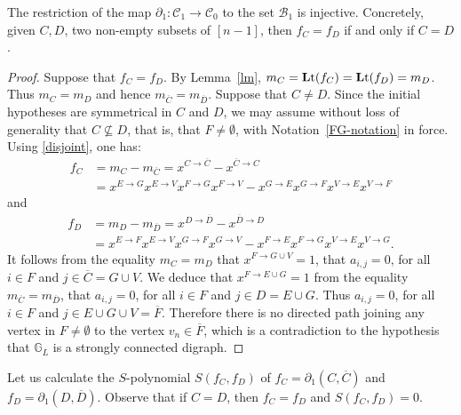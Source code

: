 \documentclass[ALCO]{cedram}
\newcommand{\mbg}{\mbox{$\mathbb{G}$}}
\newcommand{\lt}{\mbox{${\bf L}{\rm t}$}}
\newcommand{\mcb}{\mbox{$\mathcal{B}$}}
\newcommand{\mcc}{\mbox{$\mathcal{C}$}}
\newcommand{\dif}{\mbox{$\partial$}}
\begin{document}
\begin{lemma}\label{fc=fd}
The restriction of the map $\dif_1:\mcc_1\to\mcc_0$ to the set
$\mcb_1$ is injective. Concretely, given $C,D$, two non-empty subsets
of $[n-1]$, then $f_C=f_D$ if and only if $C=D$.
\end{lemma}
\begin{proof}
Suppose that $f_C=f_D$. By Lemma~\ref{lm},
$m_C=\lt(f_C)=\lt(f_D)=m_D$. Thus $m_C=m_D$ and hence
$m_{\overline{C}}=m_{\overline{D}}$. Suppose that $C\neq D$. Since the
initial hypotheses are symmetrical in $C$ and $D$, we may assume
without loss of generality that $C\not\subseteq D$, that is, that
$F\neq\emptyset$, with Notation~\ref{FG-notation} in force. Using
\eqref{disjoint}, one has:
\begin{align*}
f_C & = m_{C}-m_{\overline{C}}=x^{C\to \overline{C}}-x^{\overline{C}\to C}\\&=
  x^{E\to G}x^{E\to V}x^{F\to G}x^{F\to V}-x^{G\to E}x^{G\to F}x^{V\to
    E}x^{V\to F}
\end{align*}
and 
\begin{align*}
f_D & =  m_{D}-m_{\overline{D}}=x^{D\to \overline{D}}-x^{\overline{D}\to
    D}\\ &= x^{E\to F}x^{E\to V}x^{G\to F}x^{G\to V}-x^{F\to
    E}x^{F\to G}x^{V\to E}x^{V\to G}.
\end{align*}
It follows from the equality $m_C=m_D$ that $x^{F\to G\cup V}=1$,
\ie that $a_{i,j}=0$, for all $i\in F$ and $j\in \overline{C}=G\cup
V$. We deduce that $x^{F\to E\cup G}=1$ from the equality
$m_{\overline{C}}=m_{\overline{D}}$, \ie that $a_{i,j}=0$, for all
$i\in F$ and $j\in D=E\cup G$. Thus $a_{i,j}=0$, for all $i\in F$ and
$j\in E\cup G\cup V=\overline{F}$. Therefore there is no directed path
joining any vertex in $F\neq\emptyset$ to the vertex $v_n\in
\overline{F}$, which is a contradiction to the hypothesis that
$\mbg_L$ is a strongly connected digraph.
\end{proof}

Let us calculate the $S$-polynomial $S(f_C,f_D)$ of
$f_C=\dif_1(C,\overline{C})$ and $f_D=\dif_1(D,\overline{D})$.
Observe that if $C=D$, then $f_C=f_D$ and $S(f_C,f_D)=0$.
\end{document}
